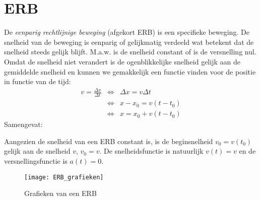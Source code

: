\documentclass{ximera}
\begin{document}
	\author{Bart Lambregs}



	\section{ERB}

	De \emph{eenparig rechtlijnige beweging} (afgekort ERB) is een specifieke beweging. De snelheid van de beweging is eenparig of gelijkmatig verdeeld wat betekent dat de snelheid steeds gelijk blijft. M.a.w. is de snelheid constant of is de versnelling nul. Omdat de snelheid niet verandert is de ogenblikkelijke snelheid gelijk aan de gemiddelde snelheid en kunnen we gemakkelijk een functie vinden voor de positie in functie van de tijd:
	\begin{eqnarray*}
	v=\frac{\Delta x}{\Delta t}&\Leftrightarrow&\Delta x=v\Delta t\\
	&\Leftrightarrow&x-x_0=v(t-t_0)\\
	&\Leftrightarrow&x=x_0+v(t-t_0)
	\end{eqnarray*}
	Samengevat:
	
	
	Aangezien de snelheid van een ERB constant is, is de beginsnelheid $v_0=v(t_0)$ gelijk aan de snelheid $v$, $v_0=v$. De snelheidsfunctie is natuurlijk $v(t)=v$ en de versnellingsfunctie is $a(t)=0$.
	\begin{figure}[h]
	\centering
	\texttt{[image: ERB\_grafieken]}
	\caption{Grafieken van een ERB}
	\end{figure}
	
	
	
\end{document}
